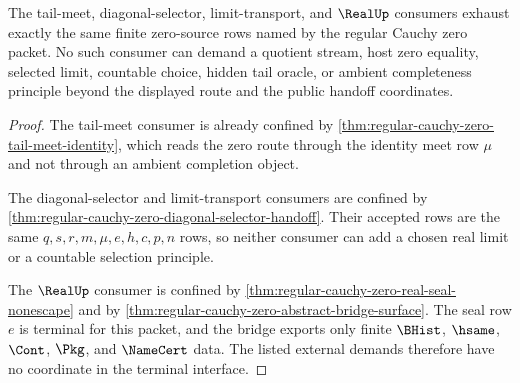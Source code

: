 \begin{theorem}
\label{thm:regular-cauchy-zero-terminal-interface-completeness}
The tail-meet, diagonal-selector, limit-transport, and $\RealUp$ consumers
exhaust exactly the same finite zero-source rows named by the regular Cauchy
zero packet. No such consumer can demand a quotient stream, host zero
equality, selected limit, countable choice, hidden tail oracle, or ambient
completeness principle beyond the displayed route and the public handoff
coordinates.
\end{theorem}
\begin{proof}
The tail-meet consumer is already confined by
\autoref{thm:regular-cauchy-zero-tail-meet-identity}, which reads the zero
route through the identity meet row $\mu$ and not through an ambient
completion object.

The diagonal-selector and limit-transport consumers are confined by
\autoref{thm:regular-cauchy-zero-diagonal-selector-handoff}. Their accepted
rows are the same $q,s,r,m,\mu,e,h,c,p,n$ rows, so neither consumer can add a
chosen real limit or a countable selection principle.

The $\RealUp$ consumer is confined by
\autoref{thm:regular-cauchy-zero-real-seal-nonescape} and by
\autoref{thm:regular-cauchy-zero-abstract-bridge-surface}. The seal row $e$
is terminal for this packet, and the bridge exports only finite $\BHist$,
$\hsame$, $\Cont$, $\Pkg$, and $\NameCert$ data. The listed external demands
therefore have no coordinate in the terminal interface.
\end{proof}

